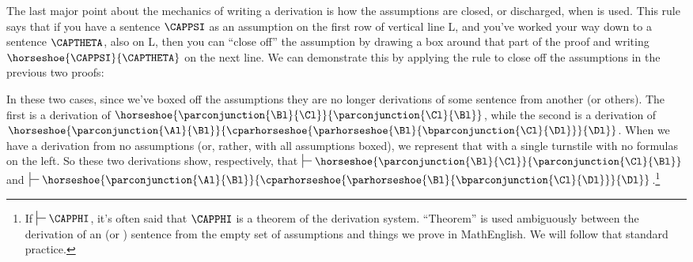 The last major point about the mechanics of writing a derivation is how the assumptions are closed, or discharged, when  is used. This rule says that if you have a sentence $\CAPPSI$ as an assumption on the first row of vertical line L, and you've worked your way down to a sentence $\CAPTHETA$, also on L, then you can ``close off'' the assumption by drawing a box around that part of the proof and writing $\horseshoe{\CAPPSI}{\CAPTHETA}$ on the next line. We can demonstrate this by applying the rule to close off the assumptions in the previous two proofs:
\begin{gproof}[\label{simpleconjunctionclosed}]
\end{gproof}
\begin{gproof}[\label{secondexamplefinished}]
\end{gproof}
\noindent{}In these two cases, since we've boxed off the assumptions they are no longer derivations of some sentence from another (or others). The first is a derivation of  $\horseshoe{\parconjunction{\Bl}{\Cl}}{\parconjunction{\Cl}{\Bl}}$, while the second is a derivation of $\horseshoe{\parconjunction{\Al}{\Bl}}{\cparhorseshoe{\parhorseshoe{\Bl}{\bparconjunction{\Cl}{\Dl}}}{\Dl}}$. When we have a derivation from no assumptions (or, rather, with all assumptions boxed), we represent that with a single turnstile with no formulas on the left. So these two derivations show, respectively, that $\sststile{}{}\horseshoe{\parconjunction{\Bl}{\Cl}}{\parconjunction{\Cl}{\Bl}}$ and $\sststile{}{}\horseshoe{\parconjunction{\Al}{\Bl}}{\cparhorseshoe{\parhorseshoe{\Bl}{\bparconjunction{\Cl}{\Dl}}}{\Dl}}$.\footnote{If  $\sststile{}{}\CAPPHI$, it's often said that $\CAPPHI$ is a theorem of the derivation system. ``Theorem'' is used ambiguously between the derivation of an \GSL  (or \GQL) sentence from the empty set of assumptions and things we prove in MathEnglish.  We will follow that standard practice.}

